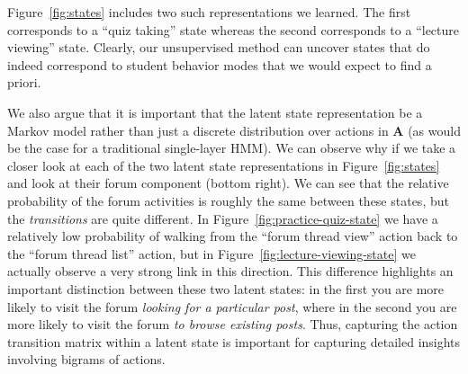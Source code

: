 Figure~\ref{fig:states} includes two such representations we learned. The
first corresponds to a ``quiz taking'' state whereas the second corresponds
to a ``lecture viewing'' state. Clearly, our unsupervised method can
uncover states that do indeed correspond to student behavior modes that we
would expect to find a priori.

We also argue that it is important that the latent state representation be
a Markov model rather than just a discrete distribution over actions in
$\mathbf{A}$ (as would be the case for a traditional single-layer HMM). We
can observe why if we take a closer look at each of the two latent state
representations in Figure~\ref{fig:states} and look at their forum
component (bottom right). We can see that the relative probability of the
forum activities is roughly the same between these states, but the
\emph{transitions} are quite different. In
Figure~\ref{fig:practice-quiz-state} we have a relatively low probability
of walking from the ``forum thread view'' action back to the ``forum thread
list'' action, but in Figure~\ref{fig:lecture-viewing-state} we actually
observe a very strong link in this direction. This difference highlights an
important distinction between these two latent states: in the first you are
more likely to visit the forum \emph{looking for a particular post}, where
in the second you are more likely to visit the forum \emph{to browse
existing posts}. Thus, capturing the action transition matrix within a
latent state is important for capturing detailed insights involving bigrams
of actions.

